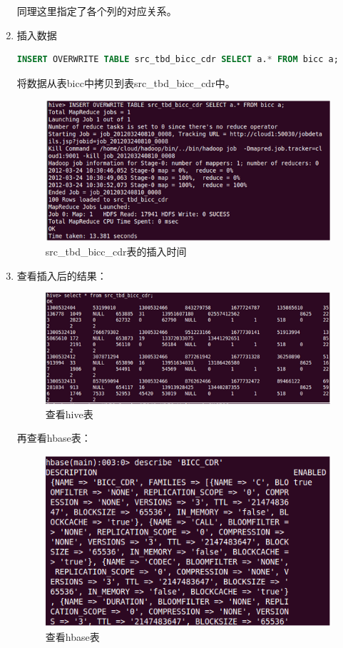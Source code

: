 \begin{enumerate}
同理这里指定了各个列的对应关系。
\item 插入数据

\begin{lstlisting}[language=SQL]
INSERT OVERWRITE TABLE src_tbd_bicc_cdr SELECT a.* FROM bicc a;
\end{lstlisting}
将数据从表bicc中拷贝到表src\_tbd\_bicc\_cdr中。

\begin{figure}[!ht]
\centering
\includegraphics[]{photo/insert-bicc-hive.png}
\caption{src\_tbd\_bicc\_cdr表的插入时间}
\end{figure} 

\item 查看插入后的结果：
\clearpage
\begin{figure}[!ht]
\centering
\includegraphics[]{photo/select-bicc-hive.png}
\caption{查看hive表}
\end{figure} 

再查看hbase表：
\begin{figure}[!ht]
\centering
\includegraphics[]{photo/scan-bicc-hbase.png}
\caption{查看hbase表}
\end{figure} 

\end{enumerate}

